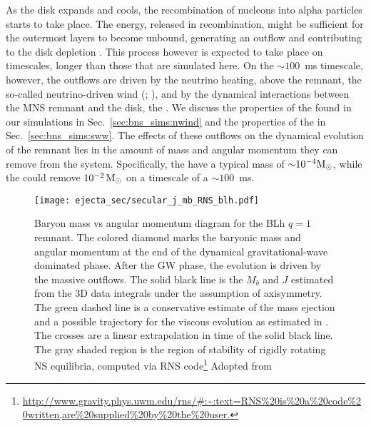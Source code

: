 As the disk expands and cools, the recombination of nucleons into alpha particles 
starts to take place. The energy, released in recombination, might be sufficient 
for the outermost layers to become unbound, generating an outflow and contributing 
to the disk depletion \citep{Beloborodov:2008nx,Lee:2009uc,Fernandez:2013tya}.
%
This process however is expected to take place on timescales, longer than
those that are simulated here. On the $\sim100$~ms timescale, however, the outflows 
are driven by the neutrino heating, above the remnant, the so-called neutrino-driven 
wind (\nwind; \citep{Dessart:2008zd,Perego:2014fma,Just:2014fka}), and by the dynamical 
interactions between the \ac{MNS} remnant and the disk, the \swind{} \citep{Nedora:2019jhl}.
%
We discuss the properties of the \nwind{} found in our simulations
in Sec.~\ref{sec:bns_sims:nwind} and the properties of the 
\swind{} in Sec.~\ref{sec:bns_sims:sww}.
The effects of these outflows on the dynamical evolution of the remnant 
lies in the amount of mass and angular momentum they can remove from the system.
%
Specifically, the \nwind{} have a typical mass of ${\sim} 10^{-4}{\text{M}_{\odot}}$, 
while the \swind{} could remove $10^{-2}\,{\text{M}_{\odot}}$ on a timescale of a $\sim100$~ms.

\begin{figure}[t]
    \centering 
    \texttt{[image: ejecta\_sec/secular\_j\_mb\_RNS\_blh.pdf]}
    \caption{Baryon mass vs angular momentum diagram for the BLh $q=1$ remnant.
        The colored diamond marks the baryonic mass and angular momentum at the end
        of the dynamical gravitational-wave dominated phase.
        After the GW phase, the evolution is driven by the massive outflows.
        The solid black line is the $M_b$ and $J$ estimated from the 3D data
        integrals under the assumption of axisymmetry.
        The green dashed line is a conservative estimate
        of the mass ejection and a possible trajectory for the viscous
        evolution as estimated in \citet{Radice:2018xqa}. The crosses are
        a linear extrapolation in time of the solid black line. The gray
        shaded region is the region of stability of rigidly rotating NS equilibria,
        computed via \ac{RNS} code\footnote{
            \url{http://www.gravity.phys.uwm.edu/rns/#:~:text=RNS%20is%20a%20code%20written,are%20supplied%20by%20the%20user.}
        }
        Adopted from \cite{Nedora:2020pak}
    }
    \label{fig:total_j_mb_rns_blh}
\end{figure}


